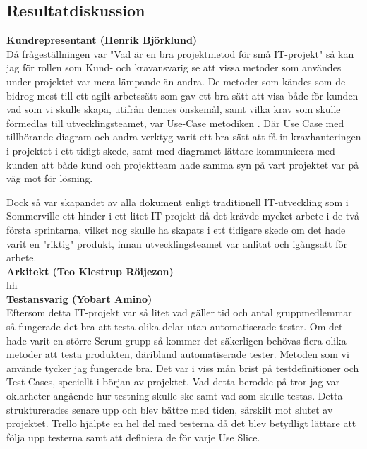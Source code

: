 \documentclass[conference,a4paper]{IEEEtran}
\begin{document}
\subsection{Resultatdiskussion}

\noindent \textbf{Kundrepresentant (Henrik Björklund)}\\
Då frågeställningen var "Vad är en bra projektmetod för små IT-projekt" så kan jag för rollen som Kund- och kravansvarig se att vissa metoder som användes under projektet var mera lämpande än andra. De metoder som kändes som de bidrog mest till ett agilt arbetssätt som gav ett bra sätt att visa både för kunden vad som vi skulle skapa, utifrån dennes önskemål, samt vilka krav som skulle förmedlas till utvecklingsteamet, var Use-Case metodiken \cite{Jacobson11}.
Där Use Case med tillhörande diagram och andra verktyg varit ett bra sätt att få in kravhanteringen i projektet i ett tidigt skede, samt med diagramet lättare kommunicera med kunden att både kund och projektteam hade samma syn på vart projektet var på väg mot för lösning.

Dock så var skapandet av alla dokument enligt traditionell IT-utveckling som i Sommerville \cite{Sommerville10} ett hinder i ett litet IT-projekt då det krävde mycket arbete i de två första sprintarna, vilket nog skulle ha skapats i ett tidigare skede om det hade varit en "riktig" produkt, innan utvecklingsteamet var anlitat och igångsatt för arbete.
\\

\noindent \textbf{Arkitekt (Teo Klestrup Röijezon)}\\
hh
\\

\noindent \textbf{Testansvarig (Yobart Amino)}\\
Eftersom detta IT-projekt var så litet vad gäller tid och antal gruppmedlemmar så fungerade det bra att testa olika delar utan automatiserade tester. Om det hade varit en större Scrum-grupp så kommer det säkerligen behövas flera olika metoder att testa produkten, däribland automatiserade tester. Metoden som vi använde tycker jag fungerade bra. Det var i viss mån brist på testdefinitioner och Test Cases, speciellt i början av projektet. Vad detta berodde på tror jag var oklarheter angående hur testning skulle ske samt vad som skulle testas. Detta strukturerades senare upp och blev bättre med tiden, särskilt mot slutet av projektet. Trello hjälpte en hel del med testerna då det blev betydligt lättare att följa upp testerna samt att definiera de för varje Use Slice. 
\end{document}
